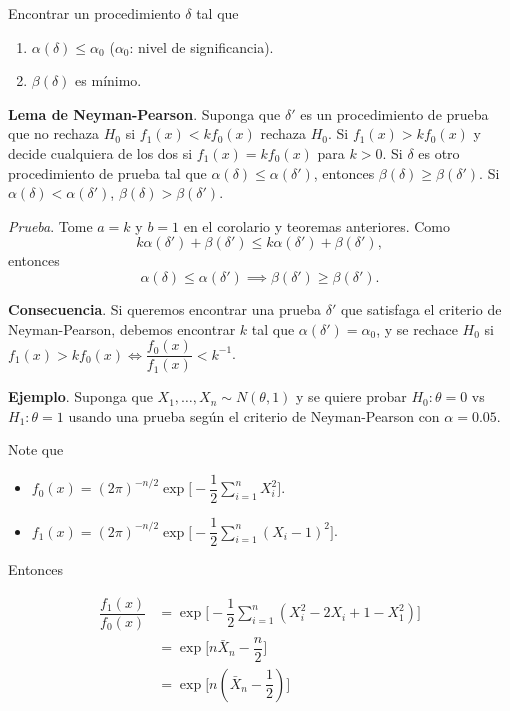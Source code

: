 \documentclass[
  12pt,
]{book}
\providecommand{\tightlist}{%
  \setlength{\itemsep}{0pt}\setlength{\parskip}{0pt}}
\begin{document}
Encontrar un procedimiento \(\delta\) tal que

\begin{enumerate}
\def\labelenumi{\arabic{enumi})}
\item
  \(\alpha(\delta) \leq \alpha_0\) (\(\alpha_0\): nivel de significancia).
\item
  \(\beta(\delta)\) es mínimo.
\end{enumerate}

\textbf{Lema de Neyman-Pearson}. Suponga que \(\delta'\) es un procedimiento de prueba
que no rechaza \(H_0\) si \(f_1(x)<kf_0(x)\) rechaza \(H_0\). Si \(f_1(x)>kf_0(x)\) y
decide cualquiera de los dos si \(f_1(x)=kf_0(x)\) para \(k>0\). Si \(\delta\) es otro
procedimiento de prueba tal que \(\alpha(\delta)\leq \alpha(\delta')\), entonces
\(\beta(\delta)\geq \beta(\delta')\). Si \(\alpha(\delta) <\alpha(\delta')\),
\(\beta(\delta)> \beta(\delta')\).

\emph{Prueba}. Tome \(a=k\) y \(b=1\) en el corolario y teoremas anteriores. Como
\[k\alpha(\delta')+\beta(\delta')\leq k\alpha(\delta')+\beta(\delta'),\]
entonces
\[\alpha(\delta)\leq \alpha(\delta')\implies \beta(\delta')\geq \beta(\delta').\]

\textbf{Consecuencia}. Si queremos encontrar una prueba \(\delta'\) que satisfaga el
criterio de Neyman-Pearson, debemos encontrar \(k\) tal que \(\alpha(\delta') = \alpha_0\), y se rechace \(H_0\) si \(f_1(x)>kf_0(x) \Leftrightarrow\dfrac{f_0(x)}{f_1(x)}<k^{-1}\).

\textbf{Ejemplo}. Suponga que \(X_1,\dots,X_n\sim N(\theta,1)\) y se quiere probar
\(H_0: \theta = 0\) vs \(H_1: \theta = 1\) usando una prueba según el criterio de
Neyman-Pearson con \(\alpha = 0.05\).

Note que

\begin{itemize}
\tightlist
\item
  \(f_0(x) = (2\pi)^{-n/2}\exp\bigg[-\dfrac 12 \sum_{i=1}^{n} X_i^2\bigg]\).
\item
  \(f_1(x) = (2\pi)^{-n/2}\exp\bigg[-\dfrac 12 \sum_{i=1}^{n} (X_i-1)^2\bigg]\).
\end{itemize}

Entonces

\begin{align*}
\dfrac{f_1(x)}{f_0(x)}
&= \exp\bigg[-\dfrac 12 \sum_{i=1}^{n} (X_i^2-2X_i+1-X_1^2)\bigg]\\
&= \exp\bigg[n\bar X_n - \dfrac n2\bigg] \\
&= \exp\bigg[n\left(\bar X_n - \dfrac 12\right)\bigg] 
\end{align*}
\end{document}
